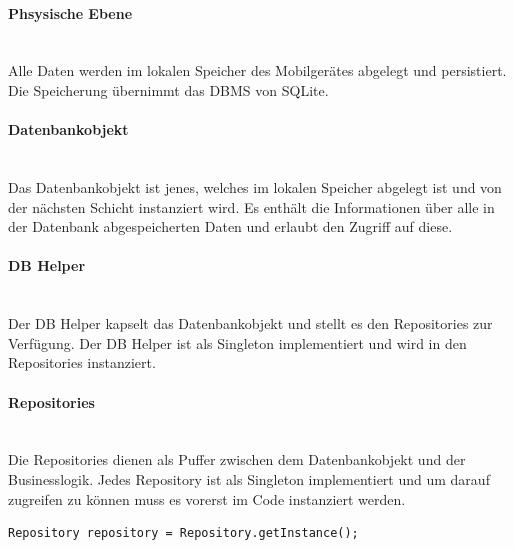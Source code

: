 \documentclass[FIPLY_base.tex]{subfiles}
\begin{document}
\paragraph{Phsysische Ebene}\ \\
Alle Daten werden im lokalen Speicher des Mobilgerätes abgelegt und persistiert. Die Speicherung übernimmt das DBMS von SQLite.

\paragraph{Datenbankobjekt}\ \\
Das Datenbankobjekt ist jenes, welches im lokalen Speicher abgelegt ist und von der nächsten Schicht instanziert wird. Es enthält die Informationen über alle in der Datenbank abgespeicherten Daten und erlaubt den Zugriff auf diese.

\paragraph{DB Helper}\ \\
Der DB Helper kapselt das Datenbankobjekt und stellt es den Repositories zur Verfügung. Der DB Helper ist als Singleton implementiert und wird in den Repositories instanziert.


\newpage
\paragraph{Repositories}\ \\
Die Repositories dienen als Puffer zwischen dem Datenbankobjekt und der Businesslogik.
Jedes Repository ist als Singleton implementiert und um darauf zugreifen zu können muss es vorerst im Code instanziert werden.
\ \\
\begin{lstlisting}[caption={Repository wird instanziert.},label=DescriptiveLabel]
Repository repository = Repository.getInstance();
\end{lstlisting}
\end{document}
